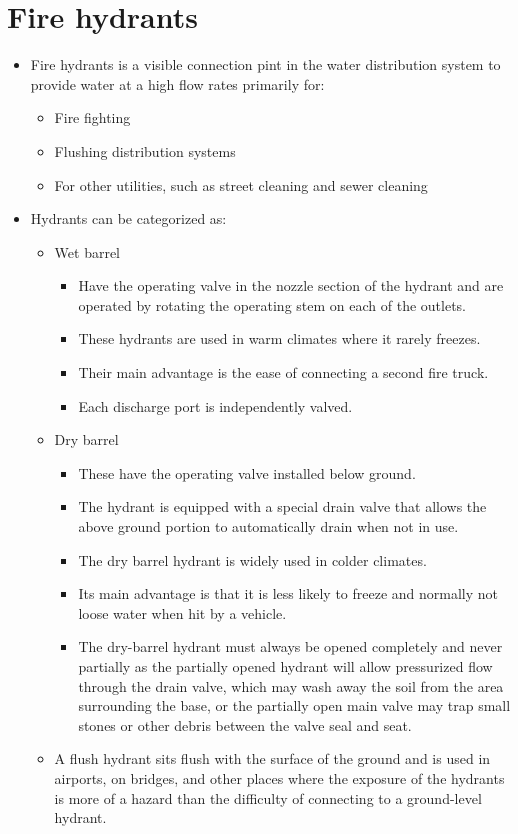 \section{Fire hydrants}
\begin{itemize}
\item Fire hydrants is a visible connection pint in the water distribution system to provide water at a high flow rates primarily for:
\begin{itemize}
\item Fire fighting
\item  Flushing distribution systems
\item For other utilities, such as street cleaning and sewer cleaning
\end{itemize}
\item Hydrants can be categorized as:
\begin{itemize}
\item Wet barrel 
\begin{itemize}
\item Have the operating valve in the nozzle section
of the hydrant and are operated by rotating the operating stem on each of the outlets.
\item These hydrants are used in warm climates where it rarely freezes.
\item Their main advantage is the ease of connecting a second fire truck. 
\item Each discharge port is independently valved.
\end{itemize}
\item Dry barrel 
\begin{itemize}
\item These have the operating valve installed below
ground.
\item The hydrant is equipped with a special drain valve that allows the above ground portion to automatically drain when not in use. 
\item The dry barrel
hydrant is widely used in colder climates. 
\item Its main advantage is that it is less
likely to freeze and normally not loose water when hit by a vehicle.
\item The dry-barrel hydrant must always be opened completely and never partially as the partially opened hydrant will allow pressurized flow through the drain valve, which may wash away the soil from the area surrounding the base, or the partially open main valve may trap small stones or other debris between the valve seal and seat.
\end{itemize}
\item A flush hydrant sits flush with the
surface of the ground and is used in airports, on bridges, and other places where the exposure of the hydrants is more of a hazard than the difficulty of connecting to a ground-level hydrant. 
\end{itemize}
\newpage
\end{itemize}
